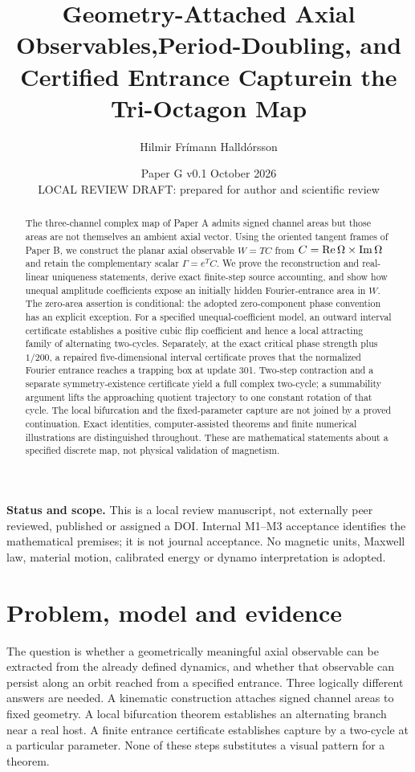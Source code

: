 \documentclass[11pt,a4paper]{article}
\title{\vspace{-10mm}Geometry-Attached Axial Observables,\newline Period-Doubling, and Certified Entrance Capture\newline in the Tri-Octagon Map}
\author{Hilmir Frímann Halldórsson}
\date{Paper G v0.1 \quad 4 October 2026\\\small LOCAL REVIEW DRAFT: prepared for author and scientific review}
\begin{document}
\maketitle\thispagestyle{fancy}
\begin{abstract}
The three-channel complex map of Paper A admits signed channel areas but those areas are not themselves an ambient axial vector. Using the oriented tangent frames of Paper B, we construct the planar axial observable $W=TC$ from $C=\operatorname{Re}\Omega\times\operatorname{Im}\Omega$ and retain the complementary scalar $\Gamma=e^TC$. We prove the reconstruction and real-linear uniqueness statements, derive exact finite-step source accounting, and show how unequal amplitude coefficients expose an initially hidden Fourier-entrance area in $W$. The zero-area assertion is conditional: the adopted zero-component phase convention has an explicit exception. For a specified unequal-coefficient model, an outward interval certificate establishes a positive cubic flip coefficient and hence a local attracting family of alternating two-cycles. Separately, at the exact critical phase strength plus $1/200$, a repaired five-dimensional interval certificate proves that the normalized Fourier entrance reaches a trapping box at update 301. Two-step contraction and a separate symmetry-existence certificate yield a full complex two-cycle; a summability argument lifts the approaching quotient trajectory to one constant rotation of that cycle. The local bifurcation and the fixed-parameter capture are not joined by a proved continuation. Exact identities, computer-assisted theorems and finite numerical illustrations are distinguished throughout. These are mathematical statements about a specified discrete map, not physical validation of magnetism.
\end{abstract}
\textbf{Status and scope.} This is a local review manuscript, not externally peer reviewed, published or assigned a DOI. Internal M1--M3 acceptance identifies the mathematical premises; it is not journal acceptance. No magnetic units, Maxwell law, material motion, calibrated energy or dynamo interpretation is adopted.

\section{Problem, model and evidence}
The question is whether a geometrically meaningful axial observable can be extracted from the already defined dynamics, and whether that observable can persist along an orbit reached from a specified entrance. Three logically different answers are needed. A kinematic construction attaches signed channel areas to fixed geometry. A local bifurcation theorem establishes an alternating branch near a real host. A finite entrance certificate establishes capture by a two-cycle at a particular parameter. None of these steps substitutes a visual pattern for a theorem.
\end{document}
